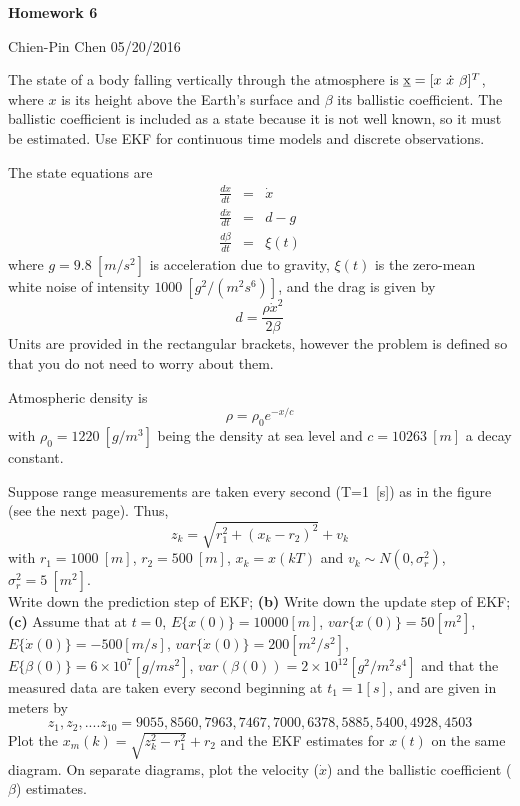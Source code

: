 \documentclass{article}
\begin{document}
 
\begin{center}
{\bf \Large  Homework 6} \\
\end{center}
Chien-Pin Chen
05/20/2016


\noindent The state of a body falling vertically through the atmosphere is $\underline{\bf \rm x}=[x\ {\dot x}\ \beta]^T$, 
where $x$ is its height above the Earth's surface and $\beta$ its ballistic coefficient. The ballistic coefficient is included as a state because it is not well known,  so it must be estimated. Use EKF for continuous time models and discrete observations.

The state equations are
\begin{eqnarray}
   \frac{d x}{dt} &=& \dot x \\
   \frac{d {\dot x}}{dt} &=& d-g \\
   \frac{d \beta}{dt} &=& \xi(t)
\end{eqnarray}
 where $g=9.8\  [m/s^2]$ is acceleration due to gravity, $\xi(t)$ is the zero-mean white noise of intensity $1000\  [g^2/(m^2 s^6)]$, 
and the drag is given by 
\begin{equation}
  d= \frac{\rho {\dot x}^2}{2 \beta}
\end{equation}
Units are provided in the rectangular brackets, however the problem is defined so that you do not need to worry about them. 

Atmospheric density is 
\begin{equation}
  \rho = \rho_0 e^{- x /c}
\end{equation}
with $\rho_0=1220\  [g/m^3]$ being the density at sea level and $c=10263\  [m]$ a decay constant.

Suppose range measurements are taken every second (T=1\  [s]) as in the figure (see the next page). Thus, 
\begin{equation}
  z_k=\sqrt{r_1^2+(x_k-r_2)^2 }+ v_k
\end{equation}
with $r_1=1000\  [m]$, $r_2=500\ [m]$,  $x_k=x(kT)$ and $v_k \sim N(0,\sigma^2_r)$,  $\sigma_r^2=5\  [m^2]$.\\


 Write down the prediction step of EKF; {\bf (b)} Write down the update step of EKF;  {\bf (c)} Assume that at $t=0$, $E\{ x(0)\}=10000[m]$, $var\{ x(0)\}=50[m^2]$,  $E\{{\dot  x}(0)\}=-500[m/s]$, 
 $var\{ {\dot x}(0)\}=200[m^2/s^2]$, $E\{\beta(0)\}=6 \times 10^7 [g/ms^2]$, 
$var(\beta(0))=2 \times 10^{12} [g^2/m^2 s^4]$ and that the measured data are taken every second 
beginning at $t_1=1[s]$, and are given in meters by 
\begin{equation}
z_1,z_2,....z_{10}= 9055, 8560, 7963, 7467, 7000, 6378, 5885, 5400, 4928, 4503
\end{equation}
Plot the $x_m(k)=\sqrt{z_k^2-r_1^2}+r_2$ and the EKF estimates for $x(t)$ on the same 
diagram. On separate diagrams, plot the velocity ($\dot x$) and the ballistic coefficient ($\beta$) estimates. 
\end{document}
